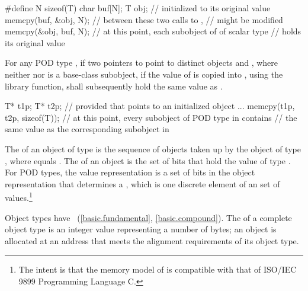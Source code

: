 \begin{codeblock}
#define N sizeof(T)
char buf[N];
T obj;                          //  initialized to its original value
memcpy(buf, &obj, N);		// between these two calls to ,
                                //  might be modified
memcpy(&obj, buf, N);		// at this point, each subobject of  of scalar type
                                // holds its original value
\end{codeblock}
\exitexampleb

\pnum
For any POD type , if two pointers to  point to
distinct  objects  and , where neither
 nor  is a base-class subobject, if the value of
 is copied into , using the 
library function,  shall subsequently hold the same value as
. \enterexample

\begin{codeblock}
T* t1p;
T* t2p;
				// provided that  points to an initialized object ...
memcpy(t1p, t2p, sizeof(T));	// at this point, every subobject of POD type in  contains
				// the same value as the corresponding subobject in 
\end{codeblock}
\exitexampleb%

\pnum
The 
%
of an object of type  is the
sequence of    objects taken up
by the object of type , where  equals
. The
%
of an object is the set of bits that hold
the value of type . For POD types, the value representation is
a set of bits in the object representation that determines a
, which is one discrete element of an
 set of values.\footnote{The
intent is that the memory model of \Cpp is compatible
with that of ISO/IEC 9899 Programming Language C.}

\pnum
Object types have
%
~(\ref{basic.fundamental}, \ref{basic.compound}).
The  of a complete object type is an
 integer value representing
a number of bytes; an object is allocated at an address that meets
the alignment requirements of its object type.


